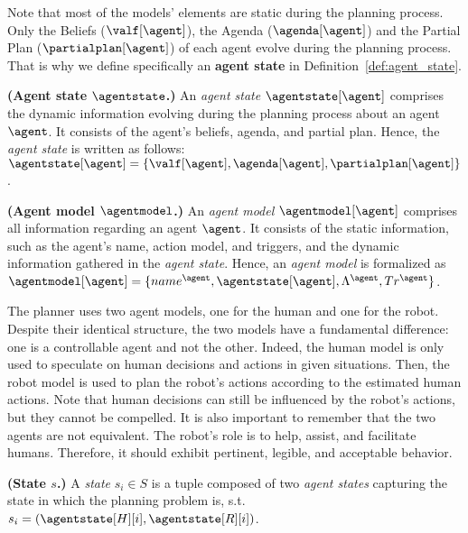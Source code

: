 Note that most of the models' elements are static during the planning process. Only the Beliefs ($\valf[\agent]$), the Agenda ($\agenda[\agent]$) and the Partial Plan ($\partialplan[\agent]$) of each agent evolve during the planning process. 
That is why we define specifically an \textbf{agent state} in Definition~\ref{def:agent_state}.

\begin{definition}
    \label{def:agent_state}
    \textbf{(Agent state $\agentstate$.)} An \emph{agent state} $\agentstate[\agent]$ comprises the dynamic information evolving during the planning process about an agent $\agent$. It consists of the agent's beliefs, agenda, and partial plan. Hence, the \emph{agent state} is written as follows: $\agentstate[\agent] = \{ \valf[\agent], \agenda[\agent], \partialplan[\agent] \}$.
\end{definition}

\begin{definition}
    \textbf{(Agent model $\agentmodel$.)} An \emph{agent model} $\agentmodel[\agent]$ comprises all information regarding an agent $\agent$. It consists of the static information, such as the agent's name, action model, and triggers, and the dynamic information gathered in the \emph{agent state}. Hence,  an \emph{agent model} is formalized as $\agentmodel[\agent] = \{ name^{\agent}, \agentstate[\agent], \Lambda^{\agent}, Tr^{\agent} \}$.
    \label{def:agent_model}
\end{definition}

The planner uses two agent models, one for the human and one for the robot. Despite their identical structure, the two models have a fundamental difference: one is a controllable agent and not the other. Indeed, the human model is only used to speculate on human decisions and actions in given situations. 
Then, the robot model is used to plan the robot's actions according to the estimated human actions.
Note that human decisions can still be influenced by the robot's actions, but they cannot be compelled.
It is also important to remember that the two agents are not equivalent. The robot's role is to help, assist, and facilitate humans. Therefore, it should exhibit pertinent, legible, and acceptable behavior.

\begin{definition}
    \textbf{(State $s$.)} A \emph{state} $s_i \in S$ is a tuple composed of two \emph{agent states} capturing the state in which the planning problem is, s.t. $s_i = ( \agentstate[H][i], \agentstate[R][i] )$.
    \label{def:state}
\end{definition}
 

